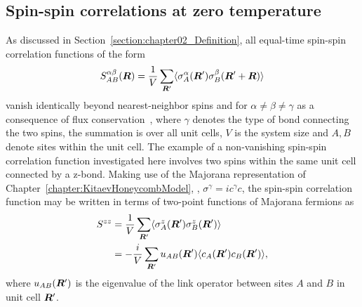 \subsection{Spin-spin correlations at zero temperature}
\label{section:chapter07_SpinSpinCorrelationsZeroTemperature}
%
%
As discussed in Section~\ref{section:chapter02_Definition}, all equal-time spin-spin correlation functions of the form
%
\begin{equation}
	S^{\alpha \beta}_{AB}(\bm{R}) = \frac{1}{V} \sum_{\bm{R}'} \langle \sigma^\alpha_A(\bm{R}') \sigma^\beta_B(\bm{R}'+\bm{R}) \rangle
\end{equation}
%
vanish identically beyond nearest-neighbor spins and for $\alpha \neq \beta \neq \gamma$ as a consequence of flux conservation~\cite{BaskaranPRL2007}, where $\gamma$ denotes the type of bond connecting the two spins, the summation is over all unit cells, $V$ is the system size and $A, B$ denote sites within the unit cell.
The example of a non-vanishing spin-spin correlation function investigated here involves two spins within the same unit cell connected by a z-bond.
Making use of the Majorana representation of Chapter~\ref{chapter:KitaevHoneycombModel}, \ie, $\sigma^{\gamma} = i c^{\gamma} c$, the spin-spin correlation function may be written in terms of two-point functions of Majorana fermions as
%
\begin{align}
	S^{z z}	&= \frac{1}{V} \sum_{\bm{R}'} \langle \sigma^z_A(\bm{R}') \sigma^z_B(\bm{R}') \rangle \nonumber\\
			&= -\frac{i}{V} \sum_{\bm{R}'} u_{AB}(\bm{R}') \langle c_A(\bm{R}') c_B(\bm{R}') \rangle,
\end{align}
%
where $u_{AB}(\bm{R}')$ is the eigenvalue of the link operator between sites $A$ and $B$ in unit cell $\bm{R}'$.

